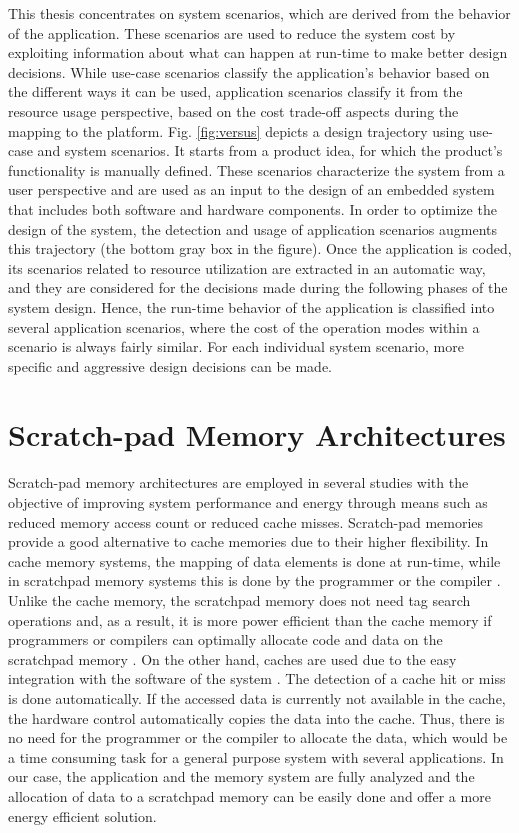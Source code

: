 This thesis concentrates on system scenarios, which are derived from the behavior of the application. 
These scenarios are used to reduce the system cost by exploiting information about what can happen at run-time to make better design decisions. 
While use-case scenarios classify the application's behavior based on the different ways it can be used, application scenarios classify it from the resource usage perspective, based on the cost trade-off aspects during the mapping to the platform. 
Fig. \ref{fig:versus} depicts a design trajectory using use-case and system scenarios. 
It starts from a product idea, for which the product's functionality is manually defined. 
These scenarios characterize the system from a user perspective and are used as an input to the design of an embedded system that includes both software and hardware components. 
In order to optimize the design of the system, the detection and usage of application scenarios augments this trajectory (the bottom gray box in the figure). 
Once the application is coded, its scenarios related to resource utilization are extracted in an automatic way, and they are considered for the decisions made during the following phases of the system design. 
Hence, the run-time behavior of the application is classified into several application scenarios, where the cost of the operation modes within a scenario is always fairly similar. 
For each individual system scenario, more specific and aggressive design decisions can be made.

\section{Scratch-pad Memory Architectures}

Scratch-pad memory architectures are employed in several studies with the objective of improving system performance and energy through means such as reduced memory access count or reduced cache misses. 
Scratch-pad memories provide a good alternative to cache memories due to their higher flexibility.
In cache memory systems, the mapping of data elements is done at run-time, while in scratchpad memory systems this is done by the programmer or the compiler \cite{ishitobi2007code}. 
Unlike the cache memory, the scratchpad memory does not need tag search operations and, as a result, it is more power efficient than the cache memory if programmers or compilers can optimally allocate code and data on the scratchpad memory \cite{steinke2002assigning}.
On the other hand, caches are used due to the easy integration with the software of the system \cite{suhendra2006integrated}.
The detection of a cache hit or miss is done automatically. 
If the accessed data is currently not available in the cache, the hardware control automatically
copies the data into the cache.
Thus, there is no need for the programmer or the compiler to allocate the data, which would be a time consuming task for a general purpose system with several applications.
In our case, the application and the memory system are fully analyzed and the allocation of data to a scratchpad memory can be easily done and offer a more energy efficient solution.

